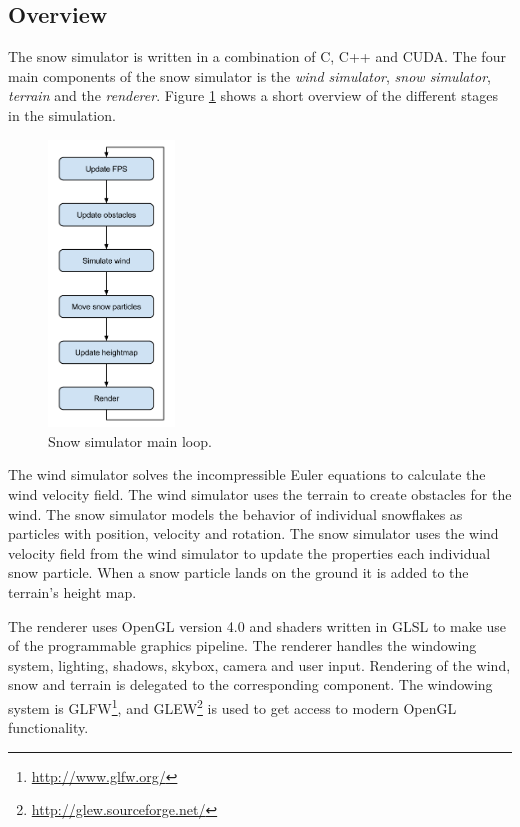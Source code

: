 \subsection{Overview}

The snow simulator is written in a combination of C, C++ and CUDA.
The four main components of the snow simulator is the \emph{wind simulator}, 
\emph{snow simulator}, \emph{terrain} and the \emph{renderer}. Figure \ref{fig:mainLoop} 
shows a short overview of the different stages in the simulation. 

\begin{figure}[ht]
	\center
	\includegraphics[width=0.30\textwidth]{images/snow_sim_main_loop}
	\caption{Snow simulator main loop.}
	\label{fig:mainLoop}
\end{figure}

The wind simulator solves the incompressible Euler equations to calculate the
wind velocity field. The wind simulator uses the terrain to create obstacles for
the wind. The snow simulator models the behavior of individual snowflakes as
particles with position, velocity and rotation. The snow simulator uses the
wind velocity field from the wind simulator to update the properties each
individual snow particle. When a snow particle lands on the ground it is added
to the terrain's height map.

The renderer uses OpenGL version 4.0 and shaders written in GLSL to make use of 
the programmable graphics pipeline. The renderer handles the windowing system, 
lighting, shadows, skybox, camera and user input. Rendering of the wind, snow and 
terrain is delegated to the corresponding component. The windowing system 
is GLFW\footnote{\url{http://www.glfw.org/}}, and GLEW\footnote{\url{http://glew.sourceforge.net/}} 
is used to get access to modern OpenGL functionality. 

